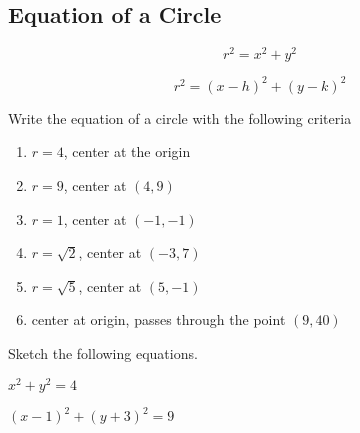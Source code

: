 \documentclass[12pt]{article}
\begin{document}
\pagebreak

\subsection*{Equation of a Circle}

$$r^2=x^2+y^2$$

$$r^2=(x-h)^2+(y-k)^2$$

Write the equation of a circle with the following criteria\\

\begin{enumerate}[resume]

	\item $r=4$, center at the origin\\
	
	\item $r=9$, center at $(4,9)$\\
	
	\item $r=1$, center at $(-1,-1)$\\
	
	\item $r=\sqrt{2}$, center at $(-3,7)$\\
	
	\item $r=\sqrt{5}$, center at $(5,-1)$\\
	
	\item center at origin, passes through the point $(9,40)$\\
	
	
\end{enumerate}

\hrulefill

Sketch the following equations.\\

\begin{enumerate}[resume]
\begin{multicols}{2}

	\item $x^2+y^2=4$\\
	
	
	\item $(x-1)^2+(y+3)^2=9$\\
	

\end{multicols}
\end{enumerate}
\end{document}
